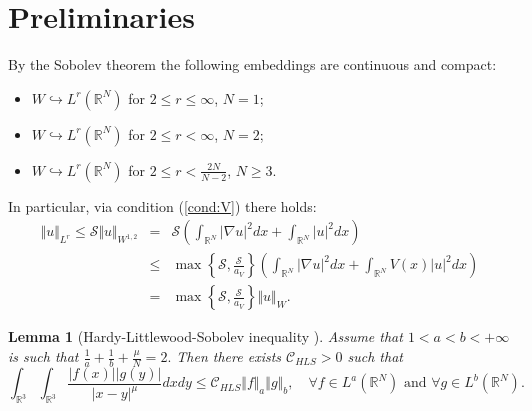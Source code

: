 \documentclass[12pt,thmsa]{article}
\newtheorem{lemma}[theorem]{Lemma}
\begin{document}
\section{Preliminaries}

By the Sobolev theorem \cite{zhang} the following embeddings are continuous
and compact:

\begin{itemize}
\item $W \hookrightarrow L^{r}(\mathbb{R}^{N})$ for $2\leq r\leq\infty$, $%
N=1 $;

\item $W \hookrightarrow L^{r}(\mathbb{R}^{N})$ for $2\leq r<\infty$, $N=2$;

\item $W\hookrightarrow L^{r}(\mathbb{R}^{N})$ for $2\leq r<\frac{2N}{N-2}$,
$N\geq 3$.
\end{itemize}

In particular, via condition (\ref{cond:V}) there holds:
\begin{eqnarray*}
\Vert u\Vert _{L^{r}}\leq \mathcal{S}\Vert u\Vert _{W^{1,2}} &=&\mathcal{S}%
\left( \int_{\mathbb{R}^{N}}|\nabla u|^{2}dx+\int_{\mathbb{R}%
^{N}}|u|^{2}dx\right) \\
&\leq &\max \left\{ \mathcal{S},\frac{\mathcal{S}}{a_{V}}\right\} \left(
\int_{\mathbb{R}^{N}}|\nabla u|^{2}dx+\int_{\mathbb{R}^{N}}V(x)|u|^{2}dx%
\right) \\
&=&\max \left\{ \mathcal{S},\frac{\mathcal{S}}{a_{V}}\right\} \Vert u\Vert
_{W}.
\end{eqnarray*}

\begin{lemma}[Hardy-Littlewood-Sobolev inequality \protect\cite{SimonReed,
zhang}]
\label{L2-10} Assume that $1<a<b<+\infty $ is such that $\frac{1}{a}+\frac{1%
}{b}+\frac{\mu }{N}=2.$ Then there exists $\mathcal{C}_{HLS}>0$ such that
\begin{equation*}
\int_{\mathbb{R}^{3}}\int_{\mathbb{R}^{3}}\frac{|f(x)||g(y)|}{|x-y|^{\mu }}%
dxdy\leq \mathcal{C}_{HLS}\Vert f\Vert _{a}\Vert g\Vert _{b},\quad \forall
f\in L^{a}(\mathbb{R}^{N})\text{ and }\forall g\in L^{b}(\mathbb{R}^{N}).
\end{equation*}
\end{lemma}
\end{document}
